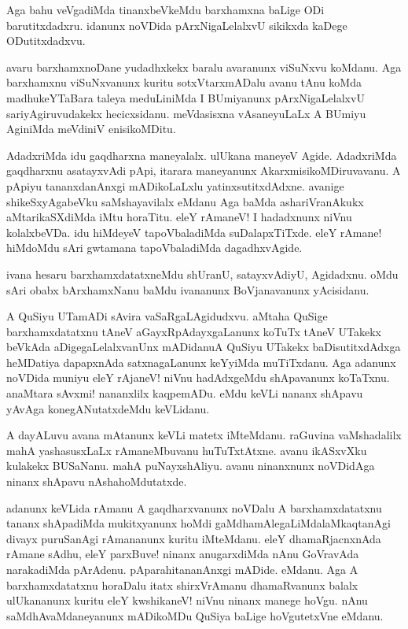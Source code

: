 \begin{mng}
Aga bahu veVgadiMda tinanxbeVkeMdu barxhamxna baLige ODi barutitxdadxru. idanunx noVDida pArxNigaLelalxvU sikikxda kaDege ODutitxdadxvu.
\end{mng}

\begin{mng}
avaru barxhamxnoDane yudadhxkekx baralu avaranunx viSuNxvu koMdanu. Aga barxhamxnu viSuNxvanunx kuritu sotxVtarxmADalu avanu tAnu koMda madhukeYTaBara taleya meduLiniMda I BUmiyanunx pArxNigaLelalxvU sariyAgiruvudakekx hecicxsidanu. meVdasisxna vAsaneyuLaLx A BUmiyu AginiMda meVdiniV enisikoMDitu.
\end{mng}

\begin{mng}
AdadxriMda idu gaqdharxna maneyalalx. ulUkana maneyeV Agide. AdadxriMda gaqdharxnu asatayxvAdi pApi, itarara maneyanunx AkarxmisikoMDiruvavanu. A pApiyu tananxdanAnxgi mADikoLaLxlu yatinxsutitxdAdxne. avanige shikeSxyAgabeVku saMshayavilalx eMdanu Aga baMda ashariVranAkukx aMtarikaSXdiMda iMtu horaTitu. eleY rAmaneV! I hadadxnunx niVnu kolalxbeVDa. idu hiMdeyeV tapoVbaladiMda suDalapxTiTxde. eleY rAmane! hiMdoMdu sAri gwtamana tapoVbaladiMda dagadhxvAgide.
\end{mng}

\begin{mng}
ivana hesaru barxhamxdatatxneMdu shUranU, satayxvAdiyU, Agidadxnu. oMdu sAri obabx bArxhamxNanu baMdu ivananunx BoVjanavanunx yAcisidanu.
\end{mng}

\begin{mng}
A QuSiyu UTamADi sAvira vaSaRgaLAgidudxvu. aMtaha QuSige barxhamxdatatxnu tAneV aGayxRpAdayxgaLanunx koTuTx tAneV UTakekx beVkAda aDigegaLelalxvanUnx mADidanu\mdash A QuSiyu UTakekx baDisutitxdAdxga heMDatiya dapapxnAda satxnagaLanunx keYyiMda muTiTxdanu. Aga adanunx noVDida muniyu eleY rAjaneV! niVnu hadAdxgeMdu shApavanunx koTaTxnu. anaMtara sAvxmi! nananxlilx kaqpemADu. eMdu keVLi nananx shApavu yAvAga konegANutatxdeMdu keVLidanu.
\end{mng}

\begin{mng}
A dayALuvu avana mAtanunx keVLi matetx iMteMdanu. raGuvina vaMshadalilx mahA yashasusxLaLx rAmaneMbuvanu huTuTxtAtxne. avanu ikASxvXku kulakekx BUSaNanu. mahA puNayxshAliyu. avanu ninanxnunx noVDidAga ninanx shApavu nAshahoMdutatxde.
\end{mng}

\begin{mng}
adanunx keVLida rAmanu A gaqdharxvanunx noVDalu A barxhamxdatatxnu tananx shApadiMda mukitxyanunx hoMdi gaMdhamAlegaLiMdalaMkaqtanAgi divayx puruSanAgi rAmananunx kuritu iMteMdanu. eleY dhamaRjacnxnAda rAmane sAdhu, eleY parxBuve! ninanx anugarxdiMda nAnu GoVravAda narakadiMda pArAdenu. pAparahitananAnxgi mADide. eMdanu. Aga A barxhamxdatatxnu horaDalu itatx shirxVrAmanu dhamaRvanunx balalx ulUkananunx kuritu eleY kwshikaneV! niVnu ninanx manege hoVgu. nAnu saMdhAvaMdaneyanunx mADikoMDu QuSiya baLige hoVgutetxVne eMdanu.
\end{mng}

